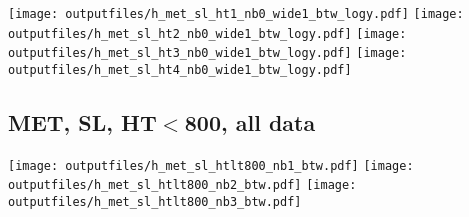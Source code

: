 \documentclass[11pt]{article}
\begin{document}
    \noindent
     \texttt{[image: outputfiles/h\_met\_sl\_ht1\_nb0\_wide1\_btw\_logy.pdf]}
     \texttt{[image: outputfiles/h\_met\_sl\_ht2\_nb0\_wide1\_btw\_logy.pdf]}
     \texttt{[image: outputfiles/h\_met\_sl\_ht3\_nb0\_wide1\_btw\_logy.pdf]}
     \texttt{[image: outputfiles/h\_met\_sl\_ht4\_nb0\_wide1\_btw\_logy.pdf]}


     \clearpage









     \subsection{ MET, SL, HT$<$800, all data}

    \noindent
     \texttt{[image: outputfiles/h\_met\_sl\_htlt800\_nb1\_btw.pdf]}
     \texttt{[image: outputfiles/h\_met\_sl\_htlt800\_nb2\_btw.pdf]}
     \texttt{[image: outputfiles/h\_met\_sl\_htlt800\_nb3\_btw.pdf]}
\end{document}
